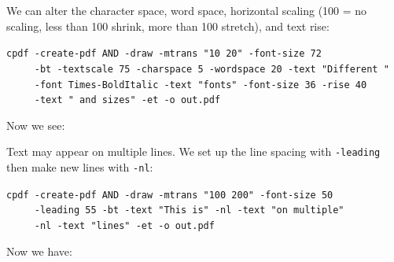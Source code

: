 \documentclass{book}
\begin{document}
\noindent We can alter the character space, word space, horizontal scaling (100 = no scaling, less than 100 shrink, more than 100 stretch), and text rise:

\begin{framed}
 \noindent\small\verb?cpdf -create-pdf AND -draw -mtrans "10 20" -font-size 72?\\
 \noindent\small\verb?     -bt -textscale 75 -charspace 5 -wordspace 20 -text "Different "?\\
 \noindent\small\verb?     -font Times-BoldItalic -text "fonts" -font-size 36 -rise 40?\\
 \noindent\small\verb?     -text " and sizes" -et -o out.pdf? 
\end{framed}

\noindent Now we see:

\bigskip
{}
\bigskip

\noindent Text may appear on multiple lines. We set up the line spacing with \texttt{-leading} then make new lines with \texttt{-nl}:

\begin{framed}
 \noindent\small\verb?cpdf -create-pdf AND -draw -mtrans "100 200" -font-size 50?\\
 \noindent\small\verb?     -leading 55 -bt -text "This is" -nl -text "on multiple"?\\
 \noindent\small\verb?     -nl -text "lines" -et -o out.pdf?
\end{framed}

\noindent Now we have:

\bigskip
{}
\bigskip
\end{document}
